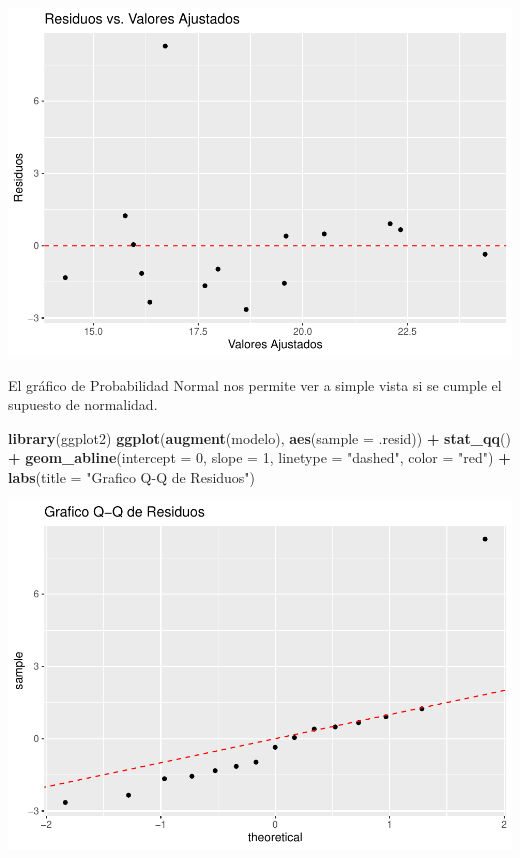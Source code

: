 \documentclass[
]{book}
\newenvironment{Shaded}{\begin{snugshade}}{\end{snugshade}}
\newcommand{\AttributeTok}[1]{\textcolor[rgb]{0.13,0.29,0.53}{#1}}
\newcommand{\DecValTok}[1]{\textcolor[rgb]{0.00,0.00,0.81}{#1}}
\newcommand{\FunctionTok}[1]{\textcolor[rgb]{0.13,0.29,0.53}{\textbf{#1}}}
\newcommand{\NormalTok}[1]{#1}
\newcommand{\SpecialCharTok}[1]{\textcolor[rgb]{0.81,0.36,0.00}{\textbf{#1}}}
\newcommand{\StringTok}[1]{\textcolor[rgb]{0.31,0.60,0.02}{#1}}
\begin{document}
\includegraphics{_main_files/figure-latex/unnamed-chunk-15-1.pdf}

El gráfico de Probabilidad Normal nos permite ver a simple vista si se cumple el supuesto de normalidad.

\begin{Shaded}
\begin{Highlighting}[]
\FunctionTok{library}\NormalTok{(ggplot2)}
\FunctionTok{ggplot}\NormalTok{(}\FunctionTok{augment}\NormalTok{(modelo), }\FunctionTok{aes}\NormalTok{(}\AttributeTok{sample =}\NormalTok{ .resid)) }\SpecialCharTok{+}
  \FunctionTok{stat\_qq}\NormalTok{() }\SpecialCharTok{+}
  \FunctionTok{geom\_abline}\NormalTok{(}\AttributeTok{intercept =} \DecValTok{0}\NormalTok{, }\AttributeTok{slope =} \DecValTok{1}\NormalTok{, }\AttributeTok{linetype =} \StringTok{"dashed"}\NormalTok{, }\AttributeTok{color =} \StringTok{"red"}\NormalTok{) }\SpecialCharTok{+}
  \FunctionTok{labs}\NormalTok{(}\AttributeTok{title =} \StringTok{"Grafico Q{-}Q de Residuos"}\NormalTok{)}
\end{Highlighting}
\end{Shaded}

\includegraphics{_main_files/figure-latex/unnamed-chunk-16-1.pdf}
\end{document}

